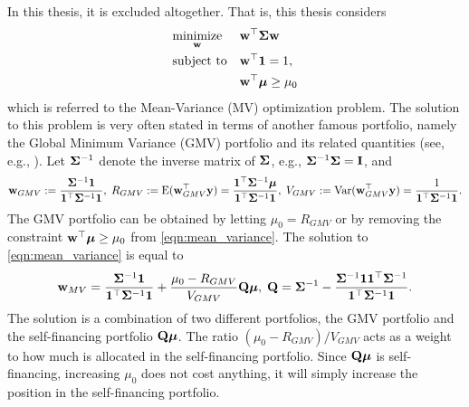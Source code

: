 \documentclass[12pt, oneside]{book}\usepackage{knitr}
\begin{document}
{In this thesis, it is excluded altogether. 
That is, this thesis considers
\begin{equation}\label{eqn:mean_variance}
\begin{aligned}
& \underset{\mathbf{w}}{\text{minimize}} 
& & \mathbf{w}^\top \mathbf{\Sigma} \mathbf{w} \\
& \text{subject to}
& & \mathbf{w}^\top \mathbf{1} = 1, \\
& && \mathbf{w}^\top \mbox{\boldmath$\mu$} \geq \mu_0 \\
\end{aligned}
\end{equation}
which is referred to the Mean-Variance (MV) optimization problem. 
The solution to this problem is very often stated in terms of another famous portfolio, namely the Global Minimum Variance (GMV) portfolio and its related quantities (see, e.g., \citet{Bodnar2009CaIotEFiEM}). 
Let $\mathbf{\Sigma}^{-1}$ denote the inverse matrix of $\mathbf{\Sigma}$, e.g., $\mathbf{\Sigma}^{-1}\mathbf{\Sigma} = \mathbf{I}$, and
\begin{equation}\label{eqn:GMV}
	\mathbf{w}_{GMV} := \frac{\mathbf{\Sigma}^{-1}\mathbf{1}}{\mathbf{1}^\top \mathbf{\Sigma}^{-1}\mathbf{1}}, \; R_{GMV} :=\operatorname{E}(\mathbf{w}_{GMV}^\top\mathbf{y}) = \frac{\mathbf{1}^\top\mathbf{\Sigma}^{-1}\mbox{\boldmath$\mu$}}{\mathbf{1}^\top \mathbf{\Sigma}^{-1}\mathbf{1}}, \;
	V_{GMV} := \operatorname{Var}(\mathbf{w}_{GMV}^\top\mathbf{y}) =\frac{1}{\mathbf{1}^\top \mathbf{\Sigma}^{-1}\mathbf{1}}.
\end{equation}
The GMV portfolio can be obtained by letting $\mu_0=R_{GMV}$ or by removing the constraint $\mathbf{w}^\top \mbox{\boldmath$\mu$} \geq \mu_0$ from \eqref{eqn:mean_variance}. 
The solution to \eqref{eqn:mean_variance} is equal to
\begin{equation}\label{eqn:mean_var_solution}
	\mathbf{w}_{MV} = \frac{\mathbf{\Sigma}^{-1}\mathbf{1}}{\mathbf{1}^\top \mathbf{\Sigma}^{-1}\mathbf{1}} + \frac{\mu_0 - R_{GMV}}{V_{GMV}} \mathbf{Q} \mbox{\boldmath$\mu$},\; \mathbf{Q} = \mathbf{\Sigma}^{-1} - \frac{\mathbf{\Sigma}^{-1} \mathbf{1} \mathbf{1}^\top \mathbf{\Sigma}^{-1}}{\mathbf{1}^\top \mathbf{\Sigma}^{-1} \mathbf{1}}.
\end{equation}
The solution is a combination of two different portfolios, the GMV portfolio and the self-financing portfolio $\mathbf{Q} \mbox{\boldmath$\mu$}$. 
The ratio $(\mu_0 - R_{GMV})/V_{GMV}$ acts as a weight to how much is allocated in the self-financing portfolio. 
Since $\mathbf{Q} \mbox{\boldmath$\mu$}$ is self-financing, increasing $\mu_0$ does not cost anything, it will simply increase the position in the self-financing portfolio.

}
\end{document}
